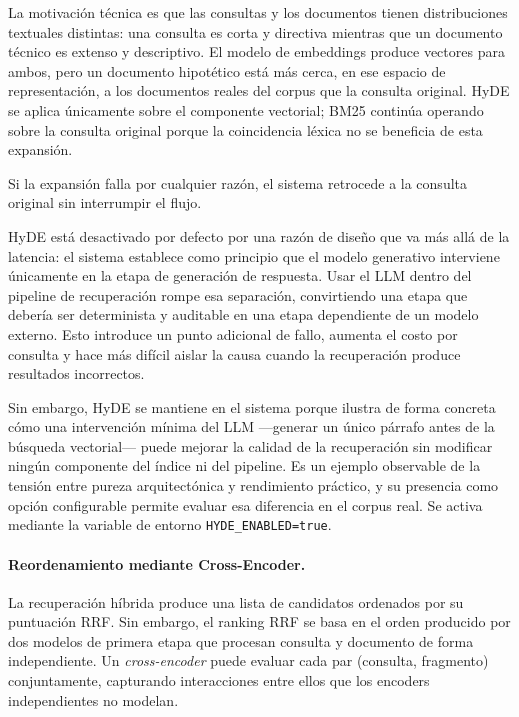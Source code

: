 \documentclass[11pt]{article}
\begin{document}
La motivación técnica es que las consultas y los documentos tienen distribuciones textuales
distintas: una consulta es corta y directiva mientras que un documento técnico es extenso y
descriptivo. El modelo de embeddings produce vectores para ambos, pero un documento hipotético
está más cerca, en ese espacio de representación, a los documentos reales del corpus que la
consulta original. HyDE se aplica únicamente sobre el componente vectorial; BM25 continúa
operando sobre la consulta original porque la coincidencia léxica no se beneficia de esta
expansión.

Si la expansión falla por cualquier razón, el sistema retrocede a la consulta original sin
interrumpir el flujo.

HyDE está desactivado por defecto por una razón de diseño que va más allá de la latencia: el
sistema establece como principio que el modelo generativo interviene únicamente en la etapa de
generación de respuesta. Usar el LLM dentro del pipeline de recuperación rompe esa separación,
convirtiendo una etapa que debería ser determinista y auditable en una etapa dependiente de un
modelo externo. Esto introduce un punto adicional de fallo, aumenta el costo por consulta y
hace más difícil aislar la causa cuando la recuperación produce resultados incorrectos.

Sin embargo, HyDE se mantiene en el sistema porque ilustra de forma concreta cómo una
intervención mínima del LLM —generar un único párrafo antes de la búsqueda vectorial— puede
mejorar la calidad de la recuperación sin modificar ningún componente del índice ni del
pipeline. Es un ejemplo observable de la tensión entre pureza arquitectónica y rendimiento
práctico, y su presencia como opción configurable permite evaluar esa diferencia en el corpus
real. Se activa mediante la variable de entorno \texttt{HYDE\_ENABLED=true}.

\paragraph{Reordenamiento mediante Cross-Encoder.}
La recuperación híbrida produce una lista de candidatos ordenados por su puntuación RRF. Sin
embargo, el ranking RRF se basa en el orden producido por dos modelos de primera etapa que
procesan consulta y documento de forma independiente. Un \emph{cross-encoder} puede evaluar cada
par (consulta, fragmento) conjuntamente, capturando interacciones entre ellos que los encoders
independientes no modelan.
\end{document}
